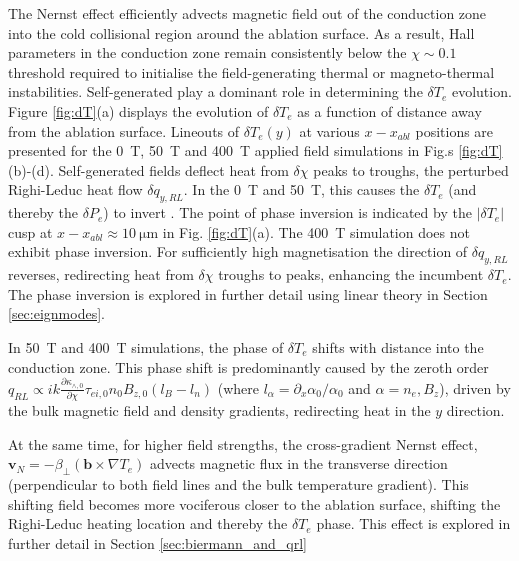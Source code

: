 \documentclass[aip,reprint]{revtex4-1}
\begin{document}
The Nernst effect efficiently advects magnetic field out of the conduction zone into the cold collisional region around the ablation surface.  As a result, Hall parameters in the conduction zone remain consistently below the $ \chi \sim 0.1$  threshold required to initialise the field-generating thermal or magneto-thermal instabilities. Self-generated play a dominant role in determining the $\delta T_e$ evolution.  Figure \ref{fig:dT}(a) displays the evolution of $\delta T_e$ as a function of distance away from the ablation surface. Lineouts of $\delta T_e(y)$ at various $x-x_{abl}$ positions are presented for the \SI{0}{T}, \SI{50}{T} and \SI{400}{T}  applied field simulations in Fig.s \ref{fig:dT}(b)-(d). Self-generated fields deflect heat from $\delta \chi$ peaks to troughs, the perturbed Righi-Leduc heat flow $\delta q_{y,RL}$. In the \SI{0}{T} and \SI{50}{T}, this causes the $\delta T_e$ (and thereby the $\delta P_e$) to invert \cite{Hill2018}. The point of phase inversion is indicated by the $|\delta T_e|$ cusp at $x-x_{abl} \approx \SI{10}{\micro\meter}$ in Fig. \ref{fig:dT}(a). The \SI{400}{T} simulation does not exhibit phase inversion. For sufficiently high magnetisation  the direction of  $\delta q_{y,RL}$ reverses, redirecting heat from $\delta \chi$ troughs to peaks, enhancing the incumbent $\delta T_e$. The phase inversion is explored in further detail using linear theory in Section \ref{sec:eignmodes}.   

In \SI{50}{T} and \SI{400}{T} simulations, the phase of $\delta T_e$ shifts with distance into the conduction zone. This phase shift is predominantly caused by the zeroth order $q_{RL} \propto i k \frac{\partial \kappa_{\wedge,0}}{\partial \chi} \tau_{ei,0} n_0 B_{z,0}\left(l_B - l_n \right)$ (where $l_{\alpha} = \partial_x \alpha_0/ \alpha_0$ and  $\alpha = n_{e}, B_z$), driven by the bulk magnetic field and density gradients, redirecting heat in the $y$ direction. 

At the same time, for higher field strengths, the cross-gradient Nernst effect, $\mathbf{v}_{N} = - \beta_{\perp} (\mathbf{b}\times \nabla T_e )$ advects magnetic flux in the transverse direction (perpendicular to both field lines and the bulk temperature gradient). This shifting field becomes more vociferous closer to the ablation surface, shifting the Righi-Leduc heating location and thereby the $\delta T_e$ phase. This effect is explored in further detail in Section \ref{sec:biermann_and_qrl}
\end{document}
